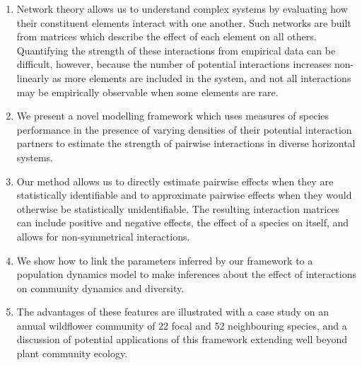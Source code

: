 \documentclass[a4,12pt]{article}
\begin{document}
    \begin{enumerate}
    \item{Network theory allows us to understand complex systems by evaluating how their constituent elements interact with one another. Such networks are built from matrices which describe the effect of each element on all others. Quantifying the strength of these interactions from empirical data can be difficult, however, because the number of potential interactions increases non-linearly as more elements are included in the system, and not all interactions may be empirically observable when some elements are rare.}
    \item{We present a novel modelling framework which uses measures of species performance in the presence of varying densities of their potential interaction partners to estimate the strength of pairwise interactions in diverse horizontal systems.}
    \item{Our method allows us to directly estimate pairwise effects when they are statistically identifiable and to approximate pairwise effects when they would otherwise be statistically unidentifiable. The resulting interaction matrices can include positive and negative effects, the effect of a species on itself, and allows for non-symmetrical interactions.}
    \item{We show how to link the parameters inferred by our framework to a population dynamics model to make inferences about the effect of interactions on community dynamics and diversity.}
    \item{The advantages of these features are illustrated with a case study on an annual wildflower community of 22 focal and 52 neighbouring species, and a discussion of potential applications of this framework extending well beyond plant community ecology.}
\end{enumerate}
\end{document}
